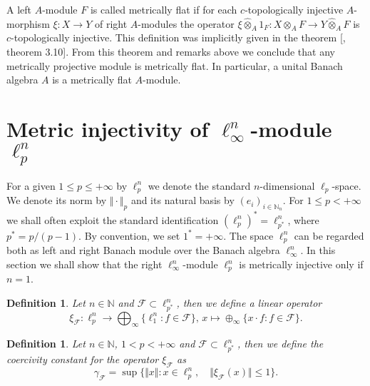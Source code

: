 \documentclass[12pt]{article}
\newtheorem{definition}[theorem]{Definition}
\newcommand{\projmodtens}[1]{\mathbin{\widehat{\otimes}}_{#1}}
\begin{document}
A left $A$-module $F$ is called metrically flat if for each $c$-topologically 
injective $A$-morphism $\xi:X\to Y$ of right $A$-modules the 
operator $\xi\projmodtens{A} 1_F:X\projmodtens{A} F\to Y\projmodtens{A} F$ 
is $c$-topologically injective. This definition was implicitly given in the 
theorem [\cite{GravInjProjBanMod}, theorem 3.10]. From this theorem and remarks 
above we conclude that any metrically projective module is metrically flat. In
particular, a unital Banach algebra $A$ is a metrically flat $A$-module.


\section{Metric injectivity of \texorpdfstring{$\ell_\infty^n$}{linftyn}-module 
\texorpdfstring{$\ell_p^n$}{lpn}}
\label{MetrInjlinftynlpn}

For a given $1\leq p\leq +\infty$ by $\ell_p^n$ we denote the 
standard $n$-dimensional $\ell_p$-space. We denote its norm 
by $\Vert\cdot\Vert_p$ and its natural basis by $(e_i)_{i\in\mathbb{N}_n}$. For 
$1\leq p<+\infty$ we shall often exploit the standard 
identification $(\ell_p^n)^*=\ell_{p^*}^n$, where $p^*=p/(p-1)$. By convention, 
we set $1^*=+\infty$. The space $\ell_p^n$ can be regarded both as left and 
right Banach module over the Banach algebra $\ell_\infty^n$. In this section 
we shall show that the right $\ell_{\infty}^n$-module $\ell_p^n$ is metrically 
injective only if $n=1$.

\begin{definition}\label{StdEmbd} 
    Let $n\in\mathbb{N}$ and $\mathcal{F}\subset\ell_{p^*}^n$, then we define
    a linear operator
    \[
        \xi_{\mathcal{F}}: 
        \ell_{p}^n \to \bigoplus_{\infty} \{ \ell_1^n: f\in\mathcal{F}\},\,
        x \mapsto \oplus_{\infty}\{ x\cdot f: f\in\mathcal{F}\}.
    \]
\end{definition}

\begin{definition}\label{StdEmbdCoercv}
    Let $n\in\mathbb{N}$, $1<p<+\infty$ and $\mathcal{F}\subset \ell_{p^*}^n$, 
    then we define the coercivity constant for the operator $\xi_{\mathcal{F}}$ 
    as
    \[
        \gamma_{\mathcal{F}}=\sup\{
            \Vert x\Vert: 
            x\in\ell_{p}^n,\quad \Vert \xi_{\mathcal{F}}(x)\Vert\leq 1
        \}.
    \]
\end{definition}
\end{document}
